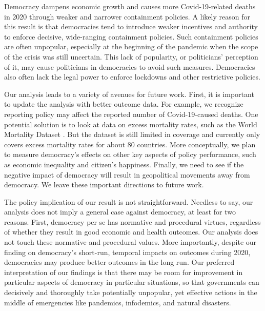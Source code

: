 Democracy dampens economic growth and causes more Covid-19-related deaths in 2020 through weaker and narrower containment policies. A likely reason for this result is that democracies tend to introduce weaker incentives and authority to enforce decisive, wide-ranging containment policies. Such containment policies are often unpopular, especially at the beginning of the pandemic when the scope of the crisis was still uncertain. This lack of popularity, or politicians' perception of it, may cause politicians in democracies to avoid such measures. Democracies also often lack the legal power to enforce lockdowns and other restrictive policies.

Our analysis leads to a variety of avenues for future work. First, it is important to update the analysis with better outcome data. 
For example, we recognize reporting policy may affect the reported number of Covid-19-caused deaths. One potential solution is to look at data on excess mortality rates, such as the World Mortality Dataset \citep{karlinskyWorldMortalityDataset2021}. But the dataset is still limited in coverage and currently only covers excess mortality rates for about 80 countries. More conceptually, we plan to measure democracy's effects on other key aspects of policy performance, such as economic inequality and citizen's happiness. Finally, we need to see if the negative impact of democracy will result in geopolitical movements away from democracy. We leave these important directions to future work. 


The policy implication of our result is not straightforward. Needless to say, our analysis does not imply a general case against democracy, at least for two reasons. First, democracy per se has normative and procedural virtues, regardless of whether they result in good economic and health outcomes. Our analysis does not touch these normative and procedural values. More importantly, despite our finding on democracy's short-run, temporal impacts on outcomes during 2020, democracies may produce better outcomes in the long run. Our preferred interpretation of our findings is that there may be room for improvement in particular aspects of democracy in particular situations, so that governments can decisively and thoroughly take potentially unpopular, yet effective actions in the middle of emergencies like pandemics, infodemics, and natural disasters.



